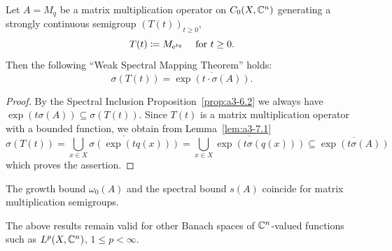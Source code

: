\begin{theorem}\label{thm:a3-7.2}
Let $A = M_{q}$ be a matrix multiplication operator on $C_{0}(X,\mathbb{C}^{n})$ generating a strongly continuous semigroup $(T(t))_{t\geq 0}$, 
%
\[
	T(t) \coloneq M_{\eu^{ t q} } \quad \text{ for $t \geq 0$.}
\]
%
Then the following \enquote{Weak Spectral Mapping Theorem}  holds: 
\[
	\sigma(T(t)) = \overline{ \exp( t \cdot \sigma(A) ) } .
\]
\end{theorem}
\begin{proof}
By the Spectral Inclusion Proposition~\ref{prop:a3-6.2} we always have $\exp(t\sigma(A)) \subseteq \sigma(T(t))$.
Since $T(t)$ is a matrix multiplication operator with a bounded function, we obtain from Lemma~\ref{lem:a3-7.1}
\[
\sigma(T(t)) = \overline{\bigcup_{x\in X} \sigma(\exp(tq(x)))} = \overline{\bigcup_{x\in X} \exp(t\sigma(q(x)))} \subseteq \overline{\exp(t\sigma(A))}
\]
which proves the assertion.
\end{proof}
\begin{corollary}\label{cor:a3-7.3}
The growth bound $\omega_{0}(A)$ and the spectral bound $s(A)$ coincide for matrix multiplication semigroups.
\end{corollary}
The above results remain valid for other Banach spaces of\/ $\mathbb{C}^{n}$-valued functions such as $L^{p}(X,\mathbb{C}^{n})$, $1 \leq p < \infty$.

